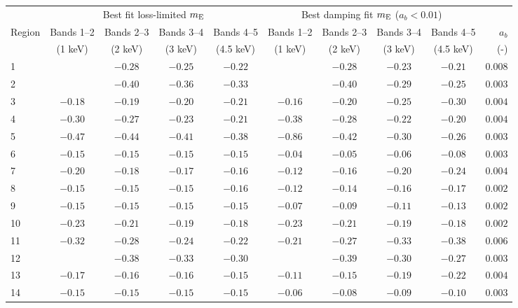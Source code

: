 \begin{tabular}{@{}l cccc cccc r@{}}
\toprule
{} & \multicolumn{4}{c}{Best fit loss-limited $m_\mathrm{E}$}
   & \multicolumn{4}{c}{Best damping fit $m_\mathrm{E}$ ($a_b < 0.01$)} \\
\cmidrule(lr){2-5} \cmidrule(l){6-10}

Region & Bands 1--2 & Bands 2--3 & Bands 3--4 & Bands 4--5
       & Bands 1--2 & Bands 2--3 & Bands 3--4 & Bands 4--5 & $a_b$ \\ [0.2em]
{} & (1 keV) & (2 keV) & (3 keV) & (4.5 keV)
   & (1 keV) & (2 keV) & (3 keV) & (4.5 keV) & (-) \\

\midrule
1  &         & $-0.28$ & $-0.25$ & $-0.22$ &         & $-0.28$ & $-0.23$ & $-0.21$ & $0.008$ \\
2  &         & $-0.40$ & $-0.36$ & $-0.33$ &         & $-0.40$ & $-0.29$ & $-0.25$ & $0.003$ \\
3  & $-0.18$ & $-0.19$ & $-0.20$ & $-0.21$ & $-0.16$ & $-0.20$ & $-0.25$ & $-0.30$ & $0.004$ \\
\cmidrule{1-10}
4  & $-0.30$ & $-0.27$ & $-0.23$ & $-0.21$ & $-0.38$ & $-0.28$ & $-0.22$ & $-0.20$ & $0.004$ \\
5  & $-0.47$ & $-0.44$ & $-0.41$ & $-0.38$ & $-0.86$ & $-0.42$ & $-0.30$ & $-0.26$ & $0.003$ \\
6  & $-0.15$ & $-0.15$ & $-0.15$ & $-0.15$ & $-0.04$ & $-0.05$ & $-0.06$ & $-0.08$ & $0.003$ \\
7  & $-0.20$ & $-0.18$ & $-0.17$ & $-0.16$ & $-0.12$ & $-0.16$ & $-0.20$ & $-0.24$ & $0.004$ \\
8  & $-0.15$ & $-0.15$ & $-0.15$ & $-0.16$ & $-0.12$ & $-0.14$ & $-0.16$ & $-0.17$ & $0.002$ \\
9  & $-0.15$ & $-0.15$ & $-0.15$ & $-0.15$ & $-0.07$ & $-0.09$ & $-0.11$ & $-0.13$ & $0.002$ \\
10 & $-0.23$ & $-0.21$ & $-0.19$ & $-0.18$ & $-0.23$ & $-0.21$ & $-0.19$ & $-0.18$ & $0.002$ \\
\cmidrule{1-10}
11 & $-0.32$ & $-0.28$ & $-0.24$ & $-0.22$ & $-0.21$ & $-0.27$ & $-0.33$ & $-0.38$ & $0.006$ \\
12 &         & $-0.38$ & $-0.33$ & $-0.30$ &         & $-0.39$ & $-0.30$ & $-0.27$ & $0.003$ \\
13 & $-0.17$ & $-0.16$ & $-0.16$ & $-0.15$ & $-0.11$ & $-0.15$ & $-0.19$ & $-0.22$ & $0.004$ \\
\cmidrule{1-10}
14 & $-0.15$ & $-0.15$ & $-0.15$ & $-0.15$ & $-0.06$ & $-0.08$ & $-0.09$ & $-0.10$ & $0.003$ \\

\end{tabular}

